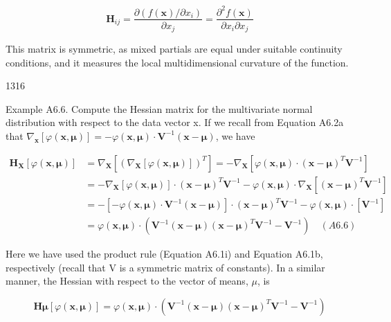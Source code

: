 \documentclass{article}
\begin{document}
\begin{equation}
\mathbf{H}_{ij}=\frac{\partial\left(f(\mathbf{x})/\partial x_{i}\right)}{\partial x_{j}}=\frac{\partial^{2}f(\mathbf{x})}{\partial x_{i}\partial x_{j}}
\end{equation}

This matrix is symmetric, as mixed partials are equal under suitable continuity conditions, and it measures the local multidimensional curvature of the function.

1316

Example A6.6. Compute the Hessian matrix for the multivariate normal distribution with respect to the data vector x. If we recall from Equation A6.2a that  $ \nabla_{\mathbf{x}}[\varphi(\mathbf{x}, \boldsymbol{\mu})] = -\varphi(\mathbf{x}, \boldsymbol{\mu}) \cdot \mathbf{V}^{-1}(\mathbf{x} - \boldsymbol{\mu}) $, we have

\begin{equation}
\begin{aligned}\mathbf{H}_{\mathbf{X}}\left[\varphi(\mathbf{x},\boldsymbol{\mu})\right]&=\nabla_{\mathbf{X}}\left[\left(\nabla_{\mathbf{X}}\left[\varphi(\mathbf{x},\boldsymbol{\mu})\right]\right)^{T}\right]=-\nabla_{\mathbf{X}}\left[\varphi(\mathbf{x},\boldsymbol{\mu})\cdot(\mathbf{x}-\boldsymbol{\mu})^{T}\mathbf{V}^{-1}\right]\\&=-\nabla_{\mathbf{X}}\left[\varphi(\mathbf{x},\boldsymbol{\mu})\right]\cdot(\mathbf{x}-\boldsymbol{\mu})^{T}\mathbf{V}^{-1}-\varphi(\mathbf{x},\boldsymbol{\mu})\cdot\nabla_{\mathbf{X}}\left[\left(\mathbf{x}-\boldsymbol{\mu}\right)^{T}\mathbf{V}^{-1}\right]\\&=-\left[-\varphi(\mathbf{x},\boldsymbol{\mu})\cdot\mathbf{V}^{-1}\left(\mathbf{x}-\boldsymbol{\mu}\right)\right]\cdot(\mathbf{x}-\boldsymbol{\mu})^{T}\mathbf{V}^{-1}-\varphi(\mathbf{x},\boldsymbol{\mu})\cdot\left[\mathbf{V}^{-1}\right]\\&=\varphi(\mathbf{x},\boldsymbol{\mu})\cdot\left(\mathbf{V}^{-1}\left(\mathbf{x}-\boldsymbol{\mu}\right)(\mathbf{x}-\boldsymbol{\mu})^{T}\mathbf{V}^{-1}-\mathbf{V}^{-1}\right)\quad(A6.6)\end{aligned}
\end{equation}

Here we have used the product rule (Equation A6.1i) and Equation A6.1b, respectively (recall that V is a symmetric matrix of constants). In a similar manner, the Hessian with respect to the vector of means,  $ \mu $, is

\begin{equation}
\mathbf{H}\boldsymbol{\mu}\left[\varphi(\mathbf{x},\boldsymbol{\mu})\right]=\varphi(\mathbf{x},\boldsymbol{\mu})\cdot\left(\mathbf{V}^{-1}\left(\mathbf{x}-\boldsymbol{\mu}\right)(\mathbf{x}-\boldsymbol{\mu})^{T}\mathbf{V}^{-1}-\mathbf{V}^{-1}\right)
\end{equation}
\end{document}
